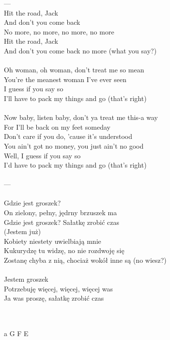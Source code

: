 \documentclass[a5paper, 10pt]{book}
\begin{document}
\begin{minipage}[t]{0.8\textwidth}
  ---\\

  Hit the road, Jack\\
  And don't you come back\\
  No more, no more, no more, no more\\
  Hit the road, Jack\\
  And don't you come back no more (what you say?)\\
  \\
  Oh woman, oh woman, don't treat me so mean\\
  You're the meanest woman I've ever seen\\
  I guess if you say so\\
  I'll have to pack my things and go (that's right)\\
  \\
  Now baby, listen baby, don't ya treat me this-a way\\
  For I'll be back on my feet someday\\
  Don't care if you do, 'cause it's understood\\
  You ain't got no money, you just ain't no good\\
  Well, I guess if you say so\\
  I'd have to pack my things and go (that's right)\\
  \\
  ---\\
  \\
  Gdzie jest groszek?\\
  On zielony, pełny, jędrny brzuszek ma\\
  Gdzie jest groszek? Sałatkę zrobić czas\\

  (Jestem już)\\
  Kobiety niestety uwielbiają mnie\\
  Kukurydzę tu widzę, no nie rozdwoję się\\
  Zostanę chyba z nią, chociaż wokół inne są (no wiesz?)\\
  \\
  Jestem groszek\\
  Potrzebuję więcej, więcej, więcej was\\
  Ja was proszę, sałatkę zrobić czas\\
\end{minipage}
\begin{minipage}[t]{0.2\textwidth}
  ~\\
  ~\\
  a G F E\\
\end{minipage}
\end{document}
